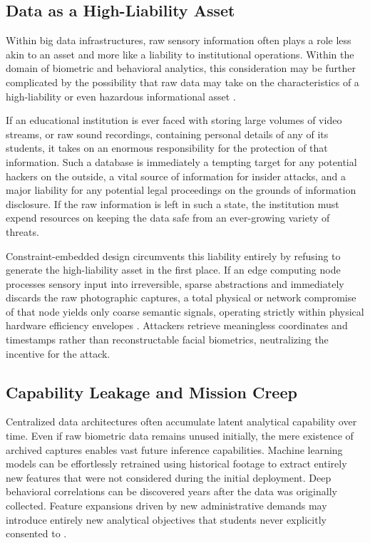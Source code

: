 \documentclass[conference]{IEEEtran}
\begin{document}
\subsection{Data as a High-Liability Asset}
Within big data infrastructures, raw sensory information often plays a role less akin to an asset and more like a liability to institutional operations. Within the domain of biometric and behavioral analytics, this consideration may be further complicated by the possibility that raw data may take on the characteristics of a high-liability or even hazardous informational asset \cite{b9}.

If an educational institution is ever faced with storing large volumes of video streams, or raw sound recordings, containing personal details of any of its students, it takes on an enormous responsibility for the protection of that information. Such a database is immediately a tempting target for any potential hackers on the outside, a vital source of information for insider attacks, and a major liability for any potential legal proceedings on the grounds of information disclosure. If the raw information is left in such a state, the institution must expend resources on keeping the data safe from an ever-growing variety of threats.

Constraint-embedded design circumvents this liability entirely by refusing to generate the high-liability asset in the first place. If an edge computing node processes sensory input into irreversible, sparse abstractions and immediately discards the raw photographic captures, a total physical or network compromise of that node yields only coarse semantic signals, operating strictly within physical hardware efficiency envelopes \cite{b28}. Attackers retrieve meaningless coordinates and timestamps rather than reconstructable facial biometrics, neutralizing the incentive for the attack.

\subsection{Capability Leakage and Mission Creep}
Centralized data architectures often accumulate latent analytical capability over time. Even if raw biometric data remains unused initially, the mere existence of archived captures enables vast future inference capabilities. Machine learning models can be effortlessly retrained using historical footage to extract entirely new features that were not considered during the initial deployment. Deep behavioral correlations can be discovered years after the data was originally collected. Feature expansions driven by new administrative demands may introduce entirely new analytical objectives that students never explicitly consented to \cite{b12}.
\end{document}
